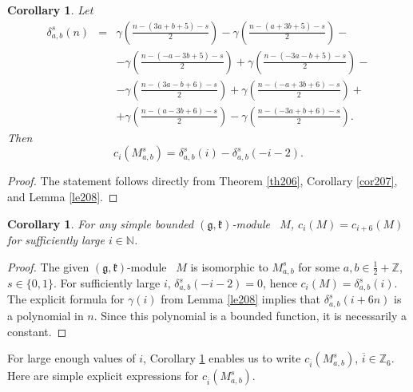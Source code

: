 \documentclass[12pt]{amsart}
\theoremstyle{plain} %
\newtheorem{corollary}[definition]{Corollary}
\newcommand {\ZZ} {\mathbb {Z}}
\newcommand {\NN} {\mathbb {N}}
\newcommand{\kk}{\mathfrak{k}}
\renewcommand{\gg}{\mathfrak{g}}
\newcommand{\half}{\frac{1}{2}}
\newcommand{\refle}[1]{Lemma \ref{#1}}
\newcommand{\refth}[1]{Theorem \ref{#1}}
\newcommand{\refcor}[1]{Corollary \ref{#1}}
\newcommand {\gkm} {$(\gg,\kk)$-module}
\begin{document}
\begin {corollary}\label{cor208}
Let
\begin{eqnarray*}
\delta_{a,b}^s(n)&=&\gamma\left(\frac{n-(3a+b+5)-s}{2}\right)-\gamma\left(\frac{n-(a+3b+5)-s}{2}\right)-\\
&&-\gamma\left(\frac{n-(-a-3b+5)-s}{2}\right)+\gamma\left(\frac{n-(-3a-b+5)-s}{2}\right)-\\
&&-\gamma\left(\frac{n-(3a-b+6)-s}{2}\right)+\gamma\left(\frac{n-(-a+3b+6)-s}{2}\right)+\\
&&+\gamma\left(\frac{n-(a-3b+6)-s}{2}\right)-\gamma\left(\frac{n-(-3a+b+6)-s}{2}\right).
\end{eqnarray*}
Then
\[
c_i(M_{a,b}^s)=\delta_{a,b}^s(i)-\delta_{a,b}^s(-i-2).
\]
\end{corollary}
\begin{proof}
The statement follows directly from \refth{th206}, \refcor{cor207}, and \refle{le208}.
\end{proof}

\begin{corollary}\label{cor209}
For any simple bounded \gkm~ $M$, $c_i(M)=c_{i+6}(M)$ for sufficiently large $i\in\NN$.
\end{corollary}
\begin{proof}
The given \gkm~ $M$ is isomorphic to $M_{a,b}^s$ for some $a,b\in \half+\ZZ$, $s\in\{0,1\}$. For sufficiently large $i$, $\delta_{a,b}^s(-i-2)=0$, hence $c_i(M)=\delta_{a,b}^s(i)$. The explicit formula for $\gamma(i)$ from \refle{le208} implies that $\delta_{a,b}^s(i+6n)$ is a polynomial in $n$. Since this polynomial is a bounded function, it is necessarily a constant.
\end{proof}

For large enough values of $i$, \refcor{cor209} enables us to write $c_{\overline{i}}(M_{a,b}^s)$, $\overline{i}\in \ZZ_6$. Here are simple explicit expressions for $c_{\overline{i}}(M_{a,b}^s)$.
\end{document}
